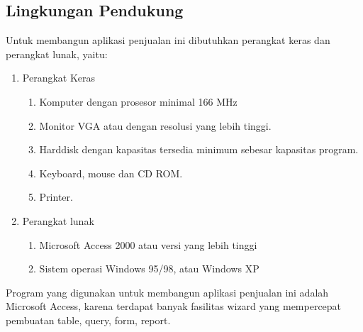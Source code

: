 \documentclass{article}
\begin{document}
\subsection{Lingkungan Pendukung}
Untuk membangun aplikasi penjualan ini dibutuhkan perangkat keras dan perangkat lunak, yaitu:
\begin{enumerate}
    \item Perangkat Keras
    \begin{enumerate}
        \item Komputer dengan prosesor minimal 166 MHz
        \item Monitor VGA atau dengan resolusi yang lebih tinggi.
        \item Harddisk dengan kapasitas tersedia minimum sebesar kapasitas program.
        \item Keyboard, mouse dan CD ROM.
        \item Printer.
    \end{enumerate}
    \item Perangkat lunak
    \begin{enumerate}
        \item Microsoft Access 2000 atau versi yang  lebih tinggi
        \item Sistem operasi Windows 95/98, atau Windows XP
    \end{enumerate}
\end{enumerate}
Program yang digunakan untuk membangun aplikasi penjualan ini adalah Microsoft Access, karena terdapat banyak fasilitas wizard yang mempercepat pembuatan table, query, form, report.
\end{document}
